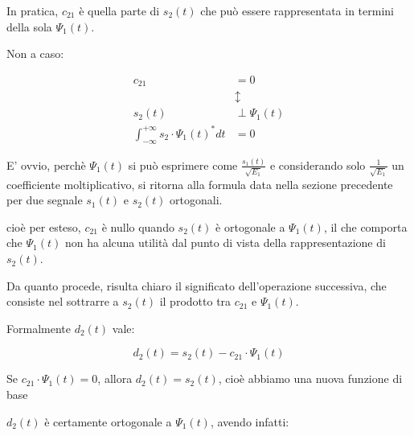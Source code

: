 In pratica, $c_{21}$ è quella parte di $s_2 (t)$ che può essere rappresentata in termini della sola $\Psi_1 (t)$. \newline 

Non a caso: 

{
    \Large 
    \begin{equation}
        \begin{split}
            c_{21} &= 0
            \\
            &\updownarrow
            \\
            s_2 (t) &\perp \Psi_1 (t)
            \\
            \int_{-\infty}^{+\infty}
            s_2 \cdot \Psi_1 (t) ^{*} dt 
            &= 
            0
        \end{split}
    \end{equation}
}

\begin{tcolorbox}
E' ovvio, perchè $\Psi_1 (t)$ si può esprimere come $\frac{s_1 (t)}{\sqrt{E_1}}$ e considerando solo $\frac{1}{\sqrt{E_1}}$ un coefficiente moltiplicativo, 
si ritorna alla formula data nella sezione precedente per due segnale $s_1 (t)$ e $s_2 (t)$ ortogonali.     
\end{tcolorbox}

cioè per esteso, $c_{21}$ è nullo quando $s_2 (t)$ è ortogonale a $\Psi_1 (t)$, 
il che comporta che $\Psi_1 (t)$ non ha alcuna utilità dal punto di vista della rappresentazione di $s_2 (t)$. \newline 

Da quanto procede, risulta chiaro il significato dell'operazione successiva, 
che consiste nel sottrarre a $s_2 (t)$ il prodotto tra $c_{21}$ e $\Psi_1 (t)$. \newline 

Formalmente $d_2 (t)$ vale:

{
    \Large
    \begin{equation}
        d_2 (t)
        = 
        s_2 (t) 
        - 
        c_{21} \cdot \Psi_1 (t)
    \end{equation}
}

\begin{tcolorbox}
    Se $c_{21} \cdot \Psi_1 (t) = 0$, allora $d_2 (t) = s_2 (t)$, cioè abbiamo una nuova funzione di base 
\end{tcolorbox}

$d_2 (t)$ è certamente ortogonale a $\Psi_1 (t)$, avendo infatti: 

